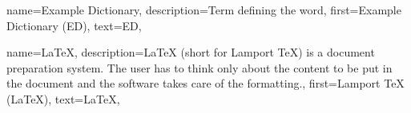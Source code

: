 {
    name={Example Dictionary},
    description={Term defining the word},
    first={Example Dictionary (ED)},
    text={ED},
}

{
    name={\LaTeX},
    description={LaTeX (short for Lamport TeX) is a document preparation system. The user has to
            think only about the content to be put in the document and the software takes care of the formatting.},
    first={Lamport TeX (\LaTeX)},
    text={\LaTeX},
}